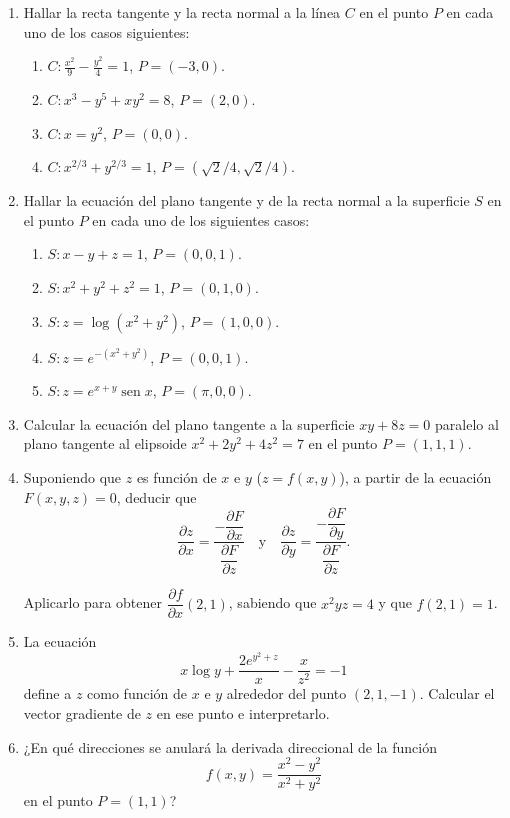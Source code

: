 \documentclass[a4paper,titlepage]{article}
\DeclareMathOperator{\sen}{sen}
\theoremstyle{solution}
\begin{document}
\begin{enumerate}[resume, leftmargin=*]
\item Hallar la recta tangente y la recta normal a la línea $C$ en el punto $P$ en cada uno de los casos siguientes:
\begin{enumerate}
\item $\displaystyle C:\frac{x^2}{9}-\frac{y^2}{4}=1$, $P=(-3,0)$.
\item $C:x^3-y^5+xy^2 = 8$, $P=(2,0)$.
\item $C:x=y^2$, $P=(0,0)$.
\item $C:x^{2/3}+y^{2/3}=1$, $P=(\sqrt2/4,\sqrt2/4)$.
\end{enumerate}

\item Hallar la ecuación del plano tangente y de la recta normal a la superficie $S$ en el punto $P$ en cada uno de los siguientes casos:
\begin{enumerate}
\item $S:x-y+z=1$, $P=(0,0,1)$.
\item $S:x^2+y^2+z^2=1$, $P=(0,1,0)$.
\item $S:z=\log(x^2+y^2)$, $P=(1,0,0)$.
\item $S:z=e^{-(x^2+y^2)}$, $P=(0,0,1)$.
\item $S:z=e^{x+y}\sen x$, $P=(\pi,0,0)$.
\end{enumerate}

\item Calcular la ecuación del plano tangente a la superficie $xy+8z=0$ paralelo al plano tangente al elipsoide $x^2+2y^2+4z^2=7$
en el punto $P=(1, 1, 1)$.

\item Suponiendo que $z$ es función de $x$ e $y$ ($z=f(x,y)$), a partir de la ecuación $F(x,y,z)=0$, deducir que 
\[
\frac{\partial z}{\partial x} = \frac{-\dfrac{\partial F}{\partial x}}{\dfrac{\partial F}{\partial z}}
\quad \mbox{y} \quad
\frac{\partial z}{\partial y} = \frac{-\dfrac{\partial F}{\partial y}}{\dfrac{\partial F}{\partial z}}.
\]

Aplicarlo para obtener $\dfrac{\partial f}{\partial x}(2,1)$, sabiendo que $x^2yz=4$ y que $f(2,1)=1$.

\item La ecuación 
\[
x\log y+\frac{2e^{y^2+z}}{x} - \frac{x}{z^2} = -1
\] 
define a $z$ como función de $x$ e $y$ alrededor del punto $(2,1,-1)$. 
Calcular el vector gradiente de $z$ en ese punto e interpretarlo.

\item ¿En qué direcciones se anulará la derivada direccional de la función
\[
f(x,y)=\frac{x^2-y^2}{x^2+y^2}
\]
en el punto $P=(1,1)$?


\end{enumerate}
\end{document}
